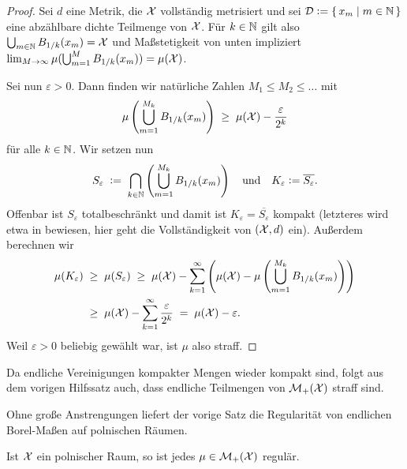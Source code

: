 \documentclass[../thesis/thesis.tex]{subfiles}
\begin{document}
	\begin{proof}
		Sei $d$ eine Metrik, die $\mathcal{X}$ vollständig metrisiert und sei 
		$\mathcal{D} \vcentcolon = \left\{\, x_m \; \middle| \; m \in \mathbb{N} \,\right\}$ eine abzählbare dichte Teilmenge von $\mathcal{X}$. 
		Für $k \in \mathbb{N}$ gilt also $\bigcup_{m \in \mathbb{N}} B_{1/k}(x_m) = \mathcal{X}$ und Maßstetigkeit 
		von unten impliziert 
		$\lim_{M \to \infty} \mu(\bigcup_{m=1}^{M} B_{1/k}(x_m)) = \mu(\mathcal{X})$.
		
		Sei nun $\varepsilon > 0$. Dann finden wir natürliche Zahlen $M_1 \leq M_2 \leq \dots$ mit
		\[ \mu\left( \bigcup_{m=1}^{M_k} B_{1/k}(x_m) \right) \; \geq \; \mu(\mathcal{X}) - \frac{\varepsilon}{2^k} \]
		für alle $k \in \mathbb{N}$. Wir setzen nun
		\[ S_\varepsilon 
		\; \vcentcolon = \; \bigcap_{k \in \mathbb{N}} \left( \bigcup_{m=1}^{M_k} B_{1/k}(x_m) \right) 
		\quad \text{und} \quad K_\varepsilon \vcentcolon = \overline{S_\varepsilon} \text{.} \]
		Offenbar ist $S_\varepsilon$ totalbeschränkt und damit ist $K_\varepsilon = \overline{S_\varepsilon}$ 
		kompakt (letzteres wird etwa in \cite[Theorem 2.3.8]{Simon.2015} bewiesen, 
		hier geht die Vollständigkeit von $(\mathcal{X}, d)$ ein).
		Außerdem berechnen wir
		\begin{align*}
			\mu(K_\varepsilon) \; &\geq \; \mu(S_\varepsilon) 
			\; \geq \; \mu(\mathcal{X}) - \sum_{k=1}^{\infty} \left( \mu(\mathcal{X}) - \mu\left( \bigcup_{m=1}^{M_k} B_{1/k}(x_m) \right) \right) \\
			\; &\geq \; \mu(\mathcal{X}) - \sum_{k=1}^{\infty} \frac{\varepsilon}{2^k} \; = \; \mu(\mathcal{X}) - \varepsilon \text{.}
		\end{align*} 
		Weil $\varepsilon > 0$ beliebig gewählt war, ist $\mu$ also straff.
	\end{proof}

	\begin{Bemerkung}
		Da endliche Vereinigungen kompakter Mengen wieder kompakt sind, folgt aus dem vorigen Hilfssatz auch, dass endliche Teilmengen von $\mathcal{M}_{+}(\mathcal{X})$ straff sind.
	\end{Bemerkung}
	
	Ohne große Anstrengungen liefert der vorige Satz die Regularität von endlichen Borel-Maßen auf polnischen Räumen.
	
	\begin{Folgerung}
		\label{folgerung:polnischer_raum_reguläre_maße}
		Ist $\mathcal{X}$ ein polnischer Raum, so ist jedes $\mu \in \mathcal{M}_{+}(\mathcal{X})$ regulär.
	\end{Folgerung}
	
\end{document}

